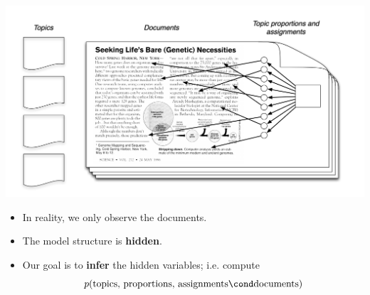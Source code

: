 \documentclass[10pt]{beamer}
\begin{document}
\begin{frame}

\begin{center}
\includegraphics[width=\textwidth]{images/lda_intro_2}
\end{center}


\begin{itemize}
\item In reality, we only observe the documents. \pause 
\item The model structure is \textbf{hidden}. \pause
\item Our goal is to \textbf{infer} the hidden variables; i.e. compute 
\[ p(\text{topics, proportions, assignments} \cond \text{documents} ) \]
\end{itemize}

\end{frame}
\end{document}
